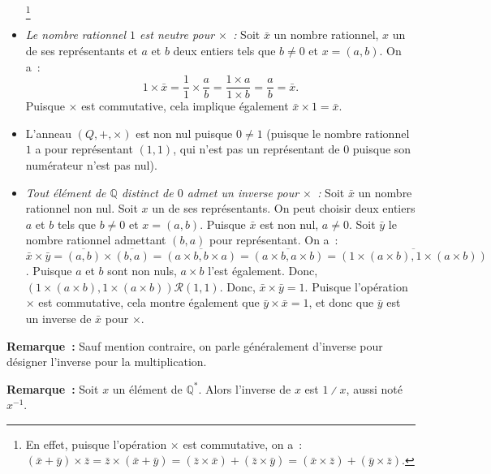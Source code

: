 \begin{itemize}[nosep]
            \footnote{En effet, puisque l'opération $\times$ est commutative, on a : $(\bar{x} + \bar{y}) \times \bar{z} = \bar{z} \times (\bar{x} + \bar{y}) = (\bar{z} \times \bar{x}) + (\bar{z} \times \bar{y}) = (\bar{x} \times \bar{z}) + (\bar{y} \times \bar{z})$.}
    \item \emph{Le nombre rationnel $1$ est neutre pour $\times$ :} 
        Soit $\bar{x}$ un nombre rationnel, $x$ un de ses représentants et $a$ et $b$ deux entiers tels que $b \neq 0$ et $x = (a, b)$. 
        On a : 
        \begin{equation*}
            1 \times \bar{x} = \frac{1}{1} \times \frac{a}{b}
                = \frac{1 \times a}{1 \times b}
                = \frac{a}{b}
                = \bar{x}.
        \end{equation*}
        Puisque $\times$ est commutative, cela implique également $\bar{x} \times 1 = \bar{x}$.
    \item L'anneau $(Q, +, \times)$ est non nul puisque $0 \neq 1$ (puisque le nombre rationnel $1$ a pour représentant $(1,1)$, qui n'est pas un représentant de $0$ puisque son numérateur n'est pas nul).
    \item \emph{Tout élément de $\mathbb{Q}$ distinct de $0$ admet un inverse pour $\times$ :} 
        Soit $\bar{x}$ un nombre rationnel non nul. 
        Soit $x$ un de ses représentants. 
        On peut choisir deux entiers $a$ et $b$ tels que $b \neq 0$ et $x = (a, b)$.
        Puisque $\bar{x}$ est non nul, $a \neq 0$. 
        Soit $\bar{y}$ le nombre rationnel admettant $(b, a)$ pour représentant.
        On a : $\bar{x} \times \bar{y} = \overline{(a, b)} \times \overline{(b, a)} = \overline{(a \times b, b \times a)} = \overline{(a \times b, a \times b)} = \overline{(1 \times (a \times b), 1 \times (a \times b))}$.
        Puisque $a$ et $b$ sont non nuls, $a \times b$ l'est également.
        Donc, $(1 \times (a \times b), 1 \times (a \times b)) \mathrel{\mathcal{R}} (1, 1)$.
        Donc, $\bar{x} \times \bar{y} = 1$.
        Puisque l'opération $\times$ est commutative, cela montre également que $\bar{y} \times \bar{x} = 1$, et donc que $\bar{y}$ est un inverse de $\bar{x}$ pour $\times$.
\end{itemize}

\medskip

\noindent\textbf{Remarque :} Sauf mention contraire, on parle généralement d'inverse pour désigner l'inverse pour la multiplication. 

\medskip

\noindent\textbf{Remarque :} Soit $x$ un élément de $\mathbb{Q}^*$. 
    Alors l'inverse de $x$ est $1 \divslash x$, aussi noté $x^{-1}$. 

